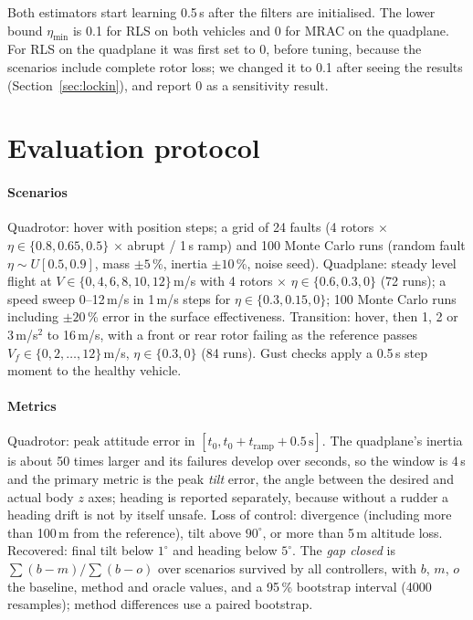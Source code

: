 \documentclass[preprint,12pt,a4paper]{elsarticle}
\begin{document}
Both estimators start learning 0.5\,s after the filters are initialised. The lower bound $\eta_{\min}$ is 0.1 for RLS on both
vehicles and 0 for MRAC on the quadplane. For RLS on the quadplane it was first set to 0, before tuning, because the scenarios include complete
rotor loss; we changed it to 0.1 after seeing the results (Section~\ref{sec:lockin}), and report 0 as a sensitivity result.

\section{Evaluation protocol}
\paragraph{Scenarios} Quadrotor: hover with position steps; a grid of 24 faults (4 rotors $\times$ $\eta\in\{0.8, 0.65, 0.5\}$
$\times$ abrupt / 1\,s ramp) and 100 Monte Carlo runs (random fault $\eta\sim U[0.5,0.9]$, mass $\pm5$\,\%, inertia $\pm10$\,\%, noise
seed). Quadplane: steady level flight at $V\in\{0,4,6,8,10,12\}$\,m/s with 4 rotors $\times$ $\eta\in\{0.6, 0.3, 0\}$ (72 runs);
a speed sweep 0--12\,m/s in 1\,m/s steps for $\eta\in\{0.3, 0.15, 0\}$; 100 Monte Carlo runs including $\pm20$\,\% error in the
surface effectiveness. Transition: hover, then 1, 2 or 3\,m/s$^2$ to 16\,m/s, with a front or rear rotor failing as the reference
passes $V_f\in\{0,2,\dots,12\}$\,m/s, $\eta\in\{0.3, 0\}$ (84 runs). Gust checks apply a 0.5\,s step moment to the healthy vehicle.

\paragraph{Metrics} Quadrotor: peak attitude error in $[t_0, t_0 + t_\text{ramp} + 0.5\,\text{s}]$. The quadplane's inertia is about 50
times larger and its failures develop over seconds, so the window is 4\,s and the primary metric is the peak \emph{tilt} error,
the angle between the desired and actual body $z$ axes; heading is reported separately, because without a rudder a heading drift
is not by itself unsafe. Loss of control: divergence (including more than 100\,m from the reference), tilt above $90^\circ$, or more
than 5\,m altitude loss. Recovered: final tilt below $1^\circ$ and heading below $5^\circ$. The \emph{gap closed} is
$\sum(b - m)/\sum(b - o)$ over scenarios survived by all controllers, with $b$, $m$, $o$ the baseline, method and oracle values,
and a 95\,\% bootstrap interval (4000 resamples); method differences use a paired bootstrap.
\end{document}
